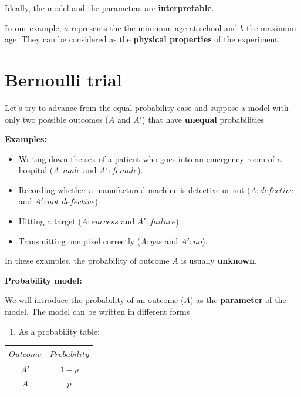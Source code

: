 \documentclass[
]{book}
\providecommand{\tightlist}{%
  \setlength{\itemsep}{0pt}\setlength{\parskip}{0pt}}
\begin{document}
Ideally, the model and the parameters are \textbf{interpretable}.

In our example, \(a\) represents the the minimum age at school and \(b\) the maximum age. They can be considered as the \textbf{physical properties} of the experiment.

\hypertarget{bernoulli-trial}{%
\section{Bernoulli trial}\label{bernoulli-trial}}

Let's try to advance from the equal probability case and suppose a model with only two possible outcomes (\(A\) and \(A'\)) that have \textbf{unequal} probabilities

\textbf{Examples:}

\begin{itemize}
\item
  Writing down the sex of a patient who goes into an emergency room of a hospital (\(A:male\) and \(A':female\)).
\item
  Recording whether a manufactured machine is defective or not (\(A:defective\) and \(A':not \,\, defective\)).
\item
  Hitting a target (\(A:success\) and \(A':failure\)).
\item
  Transmitting one pixel correctly (\(A:yes\) and \(A':no\)).
\end{itemize}

In these examples, the probability of outcome \(A\) is usually \textbf{unknown}.

\textbf{Probability model:}

We will introduce the probability of an outcome (\(A\)) as the \textbf{parameter} of the model. The model can be written in different forms

\begin{enumerate}
\def\labelenumi{\arabic{enumi})}
\tightlist
\item
  As a probability table:
\end{enumerate}

\begin{longtable}[]{@{}cc@{}}
\toprule\noalign{}
\(Outcome\) & \(Probability\) \\
\midrule\noalign{}
\endhead
\bottomrule\noalign{}
\endlastfoot
\(A'\) & \(1-p\) \\
\(A\) & \(p\) \\
\end{longtable}
\end{document}
